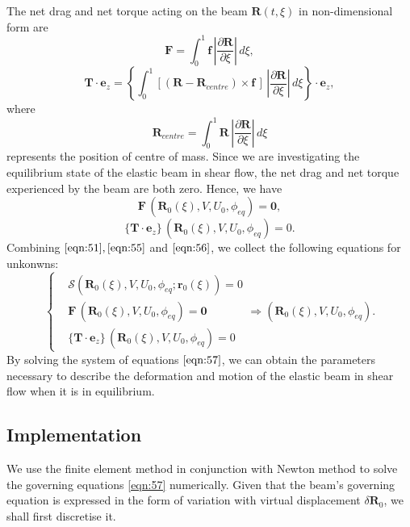 \documentclass[12pt,MSc,twoside]{muthesis_2020}
\begin{document}
The net drag and net torque acting on the beam $\textbf{R}(t,\xi)$ in non-dimensional form are 
\begin{equation}
\label{eqn:52}
\textbf{F}=\int^1_0 \textbf{f}\, \left|\frac{\partial\textbf{R}}{\partial\xi}\right|\,d\xi, 
\end{equation}
\begin{equation}
	\label{eqn:53}
\mathbf{T}\cdot\textbf{e}_z=\left\{\int^1_0 \left[(\textbf{R}-\textbf{R}_{centre})\times \textbf{f}\,\right]\,\left|\frac{\partial\textbf{R}}{\partial\xi}\right|\,d\xi\right\}\cdot\textbf{e}_z,
\end{equation}
where 
\begin{equation}
	\label{eqn:54}
\textbf{R}_{centre}=\int^1_0 \textbf{R}\,|\frac{\partial\textbf{R}}{\partial\xi}|\,d\xi
\end{equation}
represents the position of centre of mass. Since we are investigating the equilibrium state of the elastic beam in shear flow, the net drag and net torque experienced by the beam are both zero. Hence, we have 
\begin{equation}
	\label{eqn:55}
\textbf{F}\,(\textbf{R}_0(\xi), V, U_0, \phi_{eq})=\textbf{0},
\end{equation}
\begin{equation}
	\label{eqn:56}
	\{\mathbf{T}\cdot\textbf{e}_z\}\,(\textbf{R}_0(\xi), V, U_0, \phi_{eq})=0.
\end{equation} 
Combining $\eqref{eqn:51}, \eqref{eqn:55}$ and $\eqref{eqn:56}$, we collect the following equations for unkonwns:
\begin{equation}
	\label{eqn:57}
	\left\{\begin{aligned}
&\bm{\mathcal{S}}\left(\textbf{R}_0(\xi), V, U_0,\phi_{eq};\textbf{r}_0(\xi)\right)=0\\
&\textbf{F}\,(\textbf{R}_0(\xi), V, U_0, \phi_{eq})=\textbf{0}\\
&\{\mathbf{T}\cdot\textbf{e}_z\}\,(\textbf{R}_0(\xi), V, U_0, \phi_{eq})=0
\end{aligned}\right.\Longrightarrow \left(\textbf{R}_0(\xi), V, U_0, \phi_{eq}\right).
\end{equation}
By solving the system of equations $\eqref{eqn:57}$, we can obtain the parameters necessary to describe the deformation and motion of the elastic beam in shear flow when it is in equilibrium. 

\subsection{Implementation}
We use the finite element method in conjunction with Newton method to solve the governing equations \eqref{eqn:57} numerically. Given that the beam's governing equation is expressed in the form of variation with virtual displacement $\delta \mathbf{R}_0$, we shall first discretise it.
\end{document}
